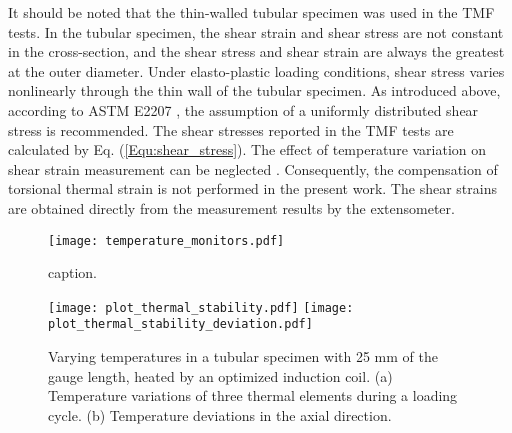 It should be noted that the thin-walled tubular specimen was used in the TMF tests. In the tubular specimen, the shear strain and shear stress are not constant in the cross-section, and the shear stress and shear strain are always the greatest at the outer diameter. Under elasto-plastic loading conditions, shear stress varies nonlinearly through the thin wall of the tubular specimen. As introduced above, according to ASTM E2207 \cite{ASTM2014}, the assumption of a uniformly distributed shear stress is recommended. The shear stresses reported in the TMF tests are calculated by Eq. (\ref{Equ:shear_stress}). The effect of temperature variation on shear strain measurement can be neglected \cite{Bakis2014}. Consequently, the compensation of torsional thermal strain is not performed in the present work. The shear strains are obtained directly from the measurement results by the extensometer.

\begin{figure}[!htp]
  \centering
  \texttt{[image: temperature\_monitors.pdf]}
  \caption{caption.}
  \label{Fig:temperature_monitors}
\end{figure}

\begin{figure}[!htp]
  \centering
  \texttt{[image: plot\_thermal\_stability.pdf]}
  \texttt{[image: plot\_thermal\_stability\_deviation.pdf]}
  \caption{Varying temperatures in a tubular specimen with 25 mm of the gauge length, heated by an optimized induction coil. (a) Temperature variations of three thermal elements during a loading cycle. (b) Temperature deviations in the axial direction.}
  \label{Fig:thermal_stability}
\end{figure}


